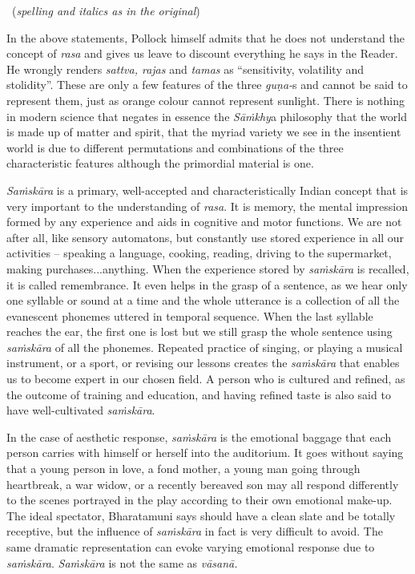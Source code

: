 \vspace{-.2cm}

\begin{myquote}

~\hfill (\textit{spelling and italics as in the original})
\end{myquote}

In the above statements, Pollock himself admits that he does not understand the concept of \textit{rasa }and gives us leave to discount everything he says in the Reader. He wrongly renders \textit{sattva, rajas} and \textit{tamas} as “sensitivity, volatility and stolidity”. These are only a few features of the three \textit{guṇa-}s and cannot be said to represent them, just as orange colour cannot represent sunlight. There is nothing in modern science that negates in essence the \textit{Sāṁkhy}a philosophy that the world is made up of matter and spirit, that the myriad variety we see in the insentient world is due to different permutations and combinations of the three characteristic features although the primordial material is one.

\textit{Saṁskāra} is a primary, well-accepted and characteristically Indian concept that is very important to the understanding of \textit{rasa}. It is memory, the mental impression formed by any experience and aids in cognitive and motor functions. We are not after all, like sensory automatons, but constantly use stored experience in all our activities – speaking a language, cooking, reading, driving to the supermarket, making purchases...anything. When the experience stored by \textit{saṁskāra} is recalled, it is called remembrance. It even helps in the grasp of a sentence, as we hear only one syllable or sound at a time and the whole utterance is a collection of all the evanescent phonemes uttered in temporal sequence. When the last syllable reaches the ear, the first one is lost but we still grasp the whole sentence using \textit{saṁskāra} of all the phonemes. Repeated practice of singing, or playing a musical instrument, or a sport, or revising our lessons creates the \textit{saṁskāra} that enables us to become expert in our chosen field. A person who is cultured and refined, as the outcome of training and education, and having refined taste is also said to have well-cultivated \textit{saṁskāra}.

In the case of aesthetic response, \textit{saṁskāra} is the emotional baggage that each person carries with himself or herself into the auditorium. It goes without saying that a young person in love, a fond mother, a young man going through heartbreak, a war widow, or a recently bereaved son may all respond differently to the scenes portrayed in the play according to their own emotional make-up. The ideal spectator, Bharatamuni says should have a clean slate and be totally receptive, but the influence of \textit{saṁskāra} in fact is very difficult to avoid. The same dramatic representation can evoke varying emotional response due to \textit{saṁskāra}. \textit{Saṁskāra} is not the same as \textit{vāsanā.}

